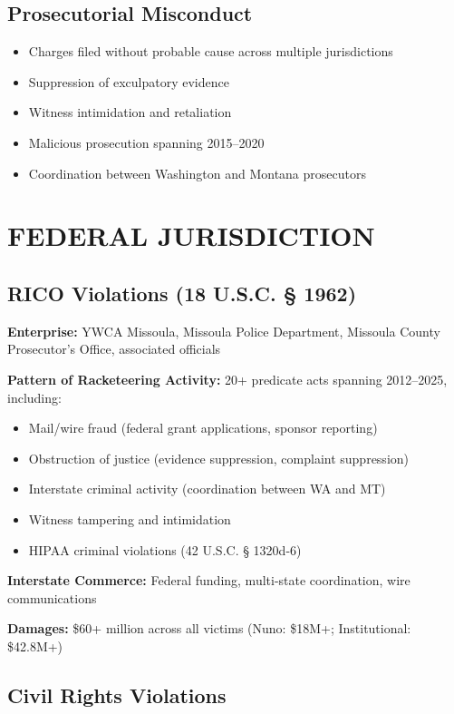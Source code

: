 \documentclass[12pt,oneside]{article}
\begin{document}
\subsection*{Prosecutorial Misconduct}

\begin{itemize}
\item Charges filed without probable cause across multiple jurisdictions
\item Suppression of exculpatory evidence
\item Witness intimidation and retaliation
\item Malicious prosecution spanning 2015--2020
\item Coordination between Washington and Montana prosecutors
\end{itemize}

\section*{FEDERAL JURISDICTION}

\subsection*{RICO Violations (18 U.S.C. § 1962)}

\textbf{Enterprise:} YWCA Missoula, Missoula Police Department, Missoula County Prosecutor's Office, associated officials

\textbf{Pattern of Racketeering Activity:} 20+ predicate acts spanning 2012--2025, including:
\begin{itemize}
\item Mail/wire fraud (federal grant applications, sponsor reporting)
\item Obstruction of justice (evidence suppression, complaint suppression)
\item Interstate criminal activity (coordination between WA and MT)
\item Witness tampering and intimidation
\item HIPAA criminal violations (42 U.S.C. § 1320d-6)
\end{itemize}

\textbf{Interstate Commerce:} Federal funding, multi-state coordination, wire communications

\textbf{Damages:} \$60+ million across all victims (Nuno: \$18M+; Institutional: \$42.8M+)

\subsection*{Civil Rights Violations}
\end{document}
